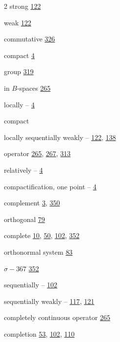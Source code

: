 \begin{multicols}{2}
\hspace*{1.1em}strong \hyperlink{page.122}{122}\par
\hspace*{1.1em}weak \hyperlink{page.122}{122}\par
\noindent commutative \hyperlink{page.326}{326}\par
\noindent compact \hyperlink{page.4}{4}\par
\hspace*{1.1em}group \hyperlink{page.319}{319}\par
\hspace*{1.1em}in $B$-spaces \hyperlink{page.265}{265}\par
\hspace*{1.1em}locally -- \hyperlink{page.4}{4}\par
\noindent compact\par
\hspace*{1.1em}locally sequentially weakly -- \hyperlink{page.122}{122}, \hyperlink{page.138}{138}\par
\hspace*{1.1em}operator \hyperlink{page.265}{265}, \hyperlink{page.267}{267}, \hyperlink{page.313}{313}\par
\hspace*{1.1em}relatively -- \hyperlink{page.4}{4}\par
\noindent compactification, one point -- \hyperlink{page.4}{4}\par
\noindent complement \hyperlink{page.3}{3}, \hyperlink{page.350}{350}\par
\hspace*{1.1em}orthogonal \hyperlink{page.79}{79}\par
\noindent complete \hyperlink{page.10}{10}, \hyperlink{page.50}{50}, \hyperlink{page.102}{102}, \hyperlink{page.352}{352}\par
\hspace*{1.1em}orthonormal system \hyperlink{page.83}{83}\par
\noindent $\sigma-367$ \hyperlink{page.352}{352}\par
\hspace*{1.1em}sequentially -- \hyperlink{page.102}{102}\par
\hspace*{1.1em}sequentially weakly -- \hyperlink{page.117}{117}, \hyperlink{page.121}{121}\par
\noindent completely continuous operator \hyperlink{page.265}{265}\par
\noindent completion \hyperlink{page.53}{53}, \hyperlink{page.102}{102}, \hyperlink{page.110}{110}\par

\end{multicols}

